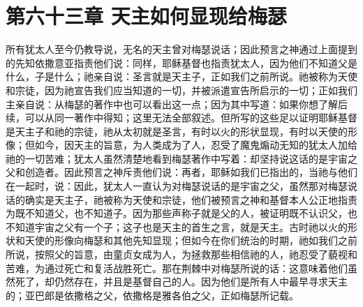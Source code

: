 
\section{第六十三章 天主如何显现给梅瑟}

所有犹太人至今仍教导说，无名的天主曾对梅瑟说话；因此预言之神通过上面提到的先知依撒意亚指责他们说：同样，耶稣基督也指责犹太人，因为他们不知道父是什么，子是什么；祂亲自说：圣言就是天主子，正如我们之前所说。祂被称为天使和宗徒，因为祂宣告我们应当知道的一切，并被派遣宣告所启示的一切；正如我们主亲自说：从梅瑟的著作中也可以看出这一点；因为其中写道：如果你想了解后续，可以从同一著作中得知；这里无法全部叙述。但所写的这些足以证明耶稣基督是天主子和祂的宗徒，祂从太初就是圣言，有时以火的形状显现，有时以天使的形像；但如今，因天主的旨意，为人类成为了人，忍受了魔鬼煽动无知的犹太人加给祂的一切苦难；犹太人虽然清楚地看到梅瑟著作中写着：却坚持说这话的是宇宙之父和创造者。因此预言之神斥责他们说：再者，耶稣如我们已指出的，当祂与他们在一起时，说：因此，犹太人一直认为对梅瑟说话的是宇宙之父，虽然那对梅瑟说话的确实是天主子，祂被称为天使和宗徒，他们被预言之神和基督本人公正地指责为既不知道父，也不知道子。因为那些声称子就是父的人，被证明既不认识父，也不知道宇宙之父有一个子；这子也是天主的首生之言，就是天主。古时祂以火的形状和天使的形像向梅瑟和其他先知显现；但如今在你们统治的时期，祂如我们之前所说，按照父的旨意，由童贞女成为人，为拯救那些相信祂的人，祂忍受了藐视和苦难，为通过死亡和复活战胜死亡。那在荆棘中对梅瑟所说的话：这意味着他们虽然死了，却仍然存在，并且是基督自己的人。因为他们是所有人中最早寻求天主的；亚巴郎是依撒格之父，依撒格是雅各伯之父，正如梅瑟所记载。\par

